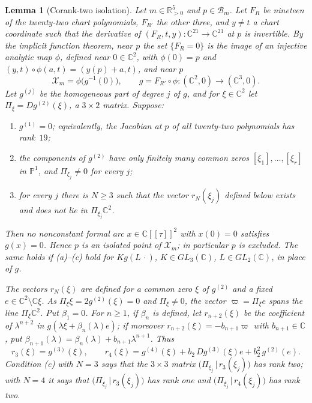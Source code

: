 \documentclass[11pt]{amsart}
\newenvironment{alphalist}{\begin{enumerate}\renewcommand{\labelenumi}{(\alph{enumi})}%
  \renewcommand{\theenumi}{\alph{enumi}}}{\end{enumerate}}
\newtheorem{lemma}[theorem]{Lemma}
\theoremstyle{definition}
\theoremstyle{remark}
\newcommand{\C}{\mathbb{C}}
\newcommand{\Rp}{\mathbb{R}_{>0}}
\begin{document}
\begin{lemma}[Corank-two isolation]\label{lem:d2-corank-two}
Let $m\in\Rp^5$ and $p\in\mathcal B_m$.  Let $F_R$ be nineteen of the twenty-two chart polynomials,
$F_{R'}$ the other three, and $y\ne t$ a chart coordinate such that the derivative of
$(F_R,t,y)\colon\C^{21}\to\C^{21}$ at $p$ is invertible.  By the implicit function theorem,
near $p$ the set $\{F_R=0\}$ is the image of an injective analytic map $\phi$, defined near
$0\in\C^2$, with $\phi(0)=p$ and $(y,t)\circ\phi(a,t)=(y(p)+a,t)$, and near $p$
\[
  \mathcal X_m=\phi\bigl(g^{-1}(0)\bigr),\qquad g=F_{R'}\circ\phi\colon(\C^2,0)\to(\C^3,0).
\]
Let $g^{(j)}$ be the homogeneous part of degree $j$ of $g$, and for $\xi\in\C^2$ let
$\Pi_\xi=Dg^{(2)}(\xi)$, a $3\times2$ matrix.  Suppose:
\begin{alphalist}
  \item $g^{(1)}=0$; equivalently, the Jacobian at $p$ of all twenty-two polynomials has
  rank~$19$;
  \item the components of $g^{(2)}$ have only finitely many common zeros $[\xi_1],\dots,[\xi_r]$
  in $\mathbb P^1$, and $\Pi_{\xi_j}\ne0$ for every $j$;
  \item for every $j$ there is $N\ge3$ such that the vector $r_N(\xi_j)$ defined below exists
  and does not lie in $\Pi_{\xi_j}\C^2$.
\end{alphalist}
Then no nonconstant formal arc $x\in\C[[\tau]]^2$ with $x(0)=0$ satisfies $g(x)=0$.  Hence $p$
is an isolated point of $\mathcal X_m$; in particular $p$ is excluded.  The same holds if
\textup{(a)--(c)} hold for $Kg(L\,\cdot)$, $K\in GL_3(\C)$, $L\in GL_2(\C)$, in place
of $g$.

The vectors $r_N(\xi)$ are defined for a common zero $\xi$ of $g^{(2)}$ and a fixed
$e\in\C^2\setminus\C\xi$.  As $\Pi_\xi\xi=2g^{(2)}(\xi)=0$ and $\Pi_\xi\ne0$, the vector
$\varpi=\Pi_\xi e$ spans the line $\Pi_\xi\C^2$.  Put $\beta_1=0$.  For $n\ge1$, if $\beta_n$ is
defined, let $r_{n+2}(\xi)$ be the coefficient of $\lambda^{n+2}$ in
$g(\lambda\xi+\beta_n(\lambda)e)$; if moreover $r_{n+2}(\xi)=-b_{n+1}\varpi$ with $b_{n+1}\in\C$,
put $\beta_{n+1}(\lambda)=\beta_n(\lambda)+b_{n+1}\lambda^{n+1}$.  Thus
\[
  r_3(\xi)=g^{(3)}(\xi),\qquad
  r_4(\xi)=g^{(4)}(\xi)+b_2\,Dg^{(3)}(\xi)e+b_2^2\,g^{(2)}(e).
\]
Condition (c) with $N=3$ says that the $3\times3$ matrix $\bigl(\Pi_{\xi_j}\,|\,r_3(\xi_j)\bigr)$
has rank two; with $N=4$ it says that $\bigl(\Pi_{\xi_j}\,|\,r_3(\xi_j)\bigr)$ has rank one and
$\bigl(\Pi_{\xi_j}\,|\,r_4(\xi_j)\bigr)$ has rank two.
\end{lemma}
\end{document}
